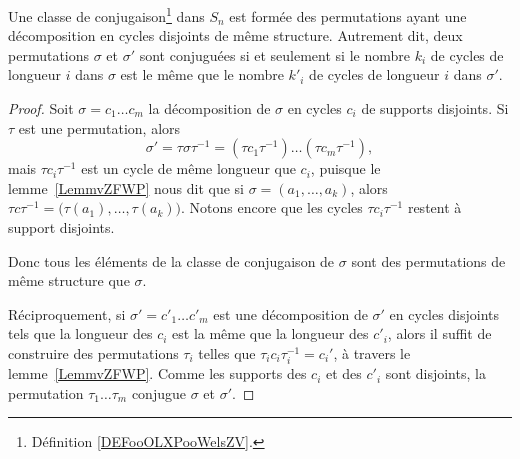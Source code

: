 \begin{proposition} \label{PropEAHWXwe}
	Une classe de conjugaison\footnote{Définition \ref{DEFooOLXPooWelsZV}.} dans \( S_n\) est formée des permutations ayant une décomposition en cycles disjoints de même structure. Autrement dit, deux permutations \( \sigma\) et \( \sigma'\) sont conjuguées si et seulement si le nombre \( k_i\) de cycles de longueur \( i\) dans \( \sigma\) est le même que le nombre \( k'_i\) de cycles de longueur \( i\) dans \( \sigma'\).
\end{proposition}

\begin{proof}
	Soit \( \sigma=c_1\ldots c_m\) la décomposition de \( \sigma\) en cycles \( c_i\) de supports disjoints. Si \( \tau\) est une permutation, alors
	\begin{equation}
		\sigma'=\tau\sigma\tau^{-1}=(\tau c_1\tau^{-1})\ldots (\tau c_m\tau^{-1}),
	\end{equation}
	mais \( \tau c_i\tau^{-1}\) est un cycle de même longueur que \( c_i\), puisque le lemme~\ref{LemmvZFWP} nous dit que si \( \sigma=(a_1,\ldots, a_k)\), alors \( \tau c\tau^{-1}=\big( \tau(a_1),\ldots, \tau(a_k) \big)\). Notons encore que les cycles \( \tau c_i\tau^{-1}\) restent à support disjoints.

	Donc tous les éléments de la classe de conjugaison de \( \sigma\) sont des permutations de même structure que \( \sigma\).

	Réciproquement, si \( \sigma'=c'_1\ldots c'_m\) est une décomposition de \( \sigma'\) en cycles disjoints tels que la longueur des \( c_i\) est la même que la longueur des \( c'_i\), alors il suffit de construire des permutations \( \tau_i\) telles que \( \tau_i c_i\tau_i^{-1}=c_i'\), à travers le lemme~\ref{LemmvZFWP}. Comme les supports des \( c_i\) et des \( c'_i\) sont disjoints, la permutation \( \tau_1\ldots \tau_m\) conjugue \( \sigma\) et \( \sigma'\).
\end{proof}

